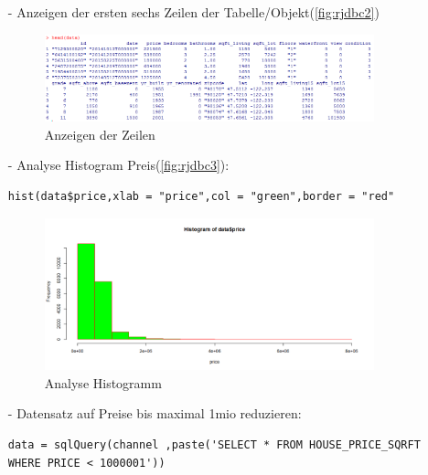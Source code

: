 \begin{itemize}
\item[-]Anzeigen der ersten sechs Zeilen der Tabelle/Objekt(\autoref{fig:rjdbc2})
\begin{figure}[!htb]
        \begin{minipage}{1\textwidth}
                \centering
                \includegraphics[width=0.90\textwidth]{pics/rjdbc2.png}\par\vspace{0cm}
                \caption{Anzeigen der Zeilen}
                \label{fig:rjdbc2}
        \end{minipage}
\end{figure}

\item[-]Analyse Histogram Preis(\autoref{fig:rjdbc3}):
\begin{lstlisting}
hist(data$price,xlab = "price",col = "green",border = "red"
\end{lstlisting}

\begin{figure}[!htb]
        \begin{minipage}{1\textwidth}
                \centering
                \includegraphics[width=0.90\textwidth]{pics/rjdbc3.png}\par\vspace{0cm}
                \caption{Analyse Histogramm}
                \label{fig:rjdbc3}
        \end{minipage}
\end{figure}

\item[-]Datensatz auf Preise bis maximal 1mio reduzieren:
\begin{lstlisting}
data = sqlQuery(channel ,paste('SELECT * FROM HOUSE_PRICE_SQRFT WHERE PRICE < 1000001'))
\end{lstlisting}


\end{itemize}
